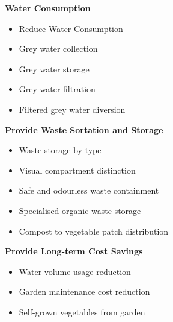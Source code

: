 \documentclass[a4paper,11pt,fleqn]{report}
\begin{document}
\noindent\textbf{Water Consumption}
\begin{itemize}
\item Reduce Water Consumption
\item Grey water collection
\item Grey water storage 
\item Grey water filtration 
\item Filtered grey water diversion 
\end{itemize}
\medskip
\textbf{Provide Waste Sortation and Storage}
\begin{itemize}
\item Waste storage by type 
\item Visual compartment distinction 
\item Safe and odourless waste containment 
\item Specialised organic waste storage 
\item Compost to vegetable patch distribution 
\end{itemize}
\medskip
\textbf{Provide Long-term Cost Savings}
\begin{itemize}
\item Water volume usage reduction
\item Garden maintenance cost reduction 
\item Self-grown vegetables from garden
\end{itemize}
\end{document}
